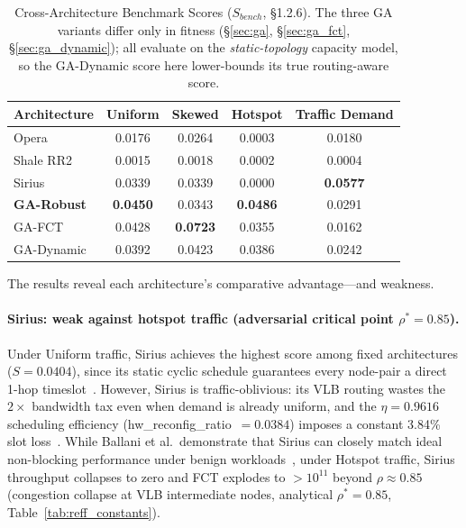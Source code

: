 \documentclass{article}
\begin{document}
    \begin{table}[H]
        \centering
        \caption{Cross-Architecture Benchmark Scores ($S_{bench}$, \S1.2.6).  The three GA variants differ only in fitness (\S\ref{sec:ga}, \S\ref{sec:ga_fct}, \S\ref{sec:ga_dynamic}); all evaluate on the \emph{static-topology} capacity model, so the GA-Dynamic score here lower-bounds its true routing-aware score.}
        \begin{tabular}{|l|c|c|c|c|}
            \hline
            \textbf{Architecture} & \textbf{Uniform} & \textbf{Skewed} & \textbf{Hotspot} & \textbf{Traffic Demand} \\
            \hline
            Opera       & 0.0176 & 0.0264 & 0.0003 & 0.0180 \\
            Shale RR2   & 0.0015 & 0.0018 & 0.0002 & 0.0004 \\
            Sirius      & 0.0339 & 0.0339 & 0.0000 & \textbf{0.0577} \\
            \textbf{GA-Robust}  & \textbf{0.0450} & 0.0343 & \textbf{0.0486} & 0.0291 \\
            GA-FCT      & 0.0428 & \textbf{0.0723} & 0.0355 & 0.0162 \\
            GA-Dynamic  & 0.0392 & 0.0423 & 0.0386 & 0.0242 \\
            \hline
        \end{tabular}
        \label{tab:final_comparison}
    \end{table}

    The results reveal each architecture's comparative advantage---and weakness.

    \paragraph{Sirius: weak against hotspot traffic (adversarial critical point $\rho^*=0.85$).}
    Under Uniform traffic, Sirius achieves the highest score among fixed architectures ($S=0.0404$), since its static cyclic schedule guarantees every node-pair a direct 1-hop timeslot~\cite{sirius}. However, Sirius is traffic-oblivious: its VLB routing wastes the $2\times$ bandwidth tax even when demand is already uniform, and the $\eta=0.9616$ scheduling efficiency (hw\_reconfig\_ratio~$=0.0384$) imposes a constant 3.84\% slot loss~\cite{sirius}. While Ballani et al.\ demonstrate that Sirius can closely match ideal non-blocking performance under benign workloads~\cite{sirius}, under Hotspot traffic, Sirius throughput collapses to zero and FCT explodes to $>10^{11}$ beyond $\rho\approx0.85$ (congestion collapse at VLB intermediate nodes, analytical $\rho^*=0.85$, Table~\ref{tab:reff_constants}).
\end{document}
